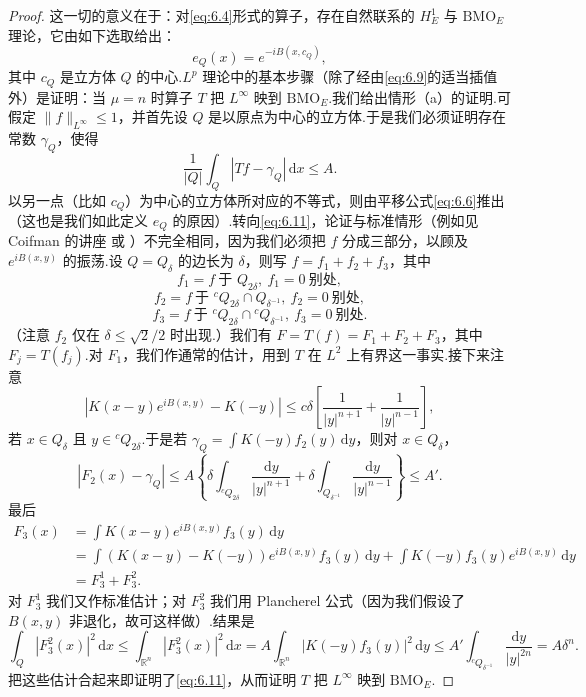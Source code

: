 \documentclass[
  BookTitleCN={傅里叶分析中的振动积分},
  BookTitleEN={Oscillatory Integrals in Fourier Analysis},
  OriginalAuthor={E.~M. Stein},
  OriginalEdition={Proc. Sympos. Pure Math. 35, Part~1},
  OriginalPublisher={American Mathematical Society},
  OriginalYear={1979},
  Translator={翻译及重排},
  ModelUsed={Codex CLI},
  Biblatex=false,
  TranslationDate={2026年8月27日}
]{mathtranslation}
\numberwithin{equation}{chapter}   %
\newcommand{\R}{\mathbb{R}}
\begin{document}
\begin{proof}
  这一切的意义在于：对\eqref{eq:6.4}形式的算子，存在自然联系的 $H_{E}^{1}$ 与 $\mathrm{BMO}_{E}$ 理论，它由如下选取给出：
  \begin{equation}
    e_{Q}(x)=e^{-iB(x,c_{Q})}, \label{eq:6.10}
  \end{equation}
  其中 $c_{Q}$ 是立方体 $Q$ 的中心.$L^{p}$ 理论中的基本步骤（除了经由\eqref{eq:6.9}的适当插值外）是证明：当 $\mu=n$ 时算子 $T$ 把 $L^{\infty}$ 映到 $\mathrm{BMO}_{E}$.我们给出情形（a）的证明.可假定 $\|f\|_{L^{\infty}}\leq1$，并首先设 $Q$ 是以原点为中心的立方体.于是我们必须证明存在常数 $\gamma_{Q}$，使得
  \begin{equation}
    \frac{1}{|Q|}\int_{Q}|Tf-\gamma_{Q}|\,\mathrm{d}x\leq A . \label{eq:6.11}
  \end{equation}
  以另一点（比如 $c_{Q}$）为中心的立方体所对应的不等式，则由平移公式\eqref{eq:6.6}推出（这也是我们如此定义 $e_{Q}$ 的原因）.转向\eqref{eq:6.11}，论证与标准情形（例如见 Coifman 的讲座 \cite{ref5} 或 \cite{ref9}）不完全相同，因为我们必须把 $f$ 分成三部分，以顾及 $e^{iB(x,y)}$ 的振荡.设 $Q=Q_{\delta}$ 的边长为 $\delta$，则写 $f=f_{1}+f_{2}+f_{3}$，其中
  \[
    f_{1}=f\ \text{于 }Q_{2\delta},\ f_{1}=0\ \text{别处},
  \]
  \[
    f_{2}=f\ \text{于 }{}^cQ_{2\delta}\cap Q_{\delta^{-1}},\ f_{2}=0\ \text{别处},
  \]
  \[
    f_{3}=f\ \text{于 }{}^cQ_{2\delta}\cap{}^cQ_{\delta^{-1}},\ f_{3}=0\ \text{别处} .
  \]
  （注意 $f_{2}$ 仅在 $\delta\leq\sqrt{2}/2$ 时出现.）我们有 $F=T(f)=F_{1}+F_{2}+F_{3}$，其中 $F_{j}=T(f_{j})$.对 $F_{1}$，我们作通常的估计，用到 $T$ 在 $L^{2}$ 上有界这一事实.接下来注意
  \[
    |K(x-y)e^{iB(x,y)}-K(-y)|\leq c\delta\left[\frac{1}{|y|^{n+1}}+\frac{1}{|y|^{n-1}}\right],
  \]
  若 $x\in Q_{\delta}$ 且 $y\in{}^cQ_{2\delta}$.于是若 $\gamma_{Q}=\int K(-y)f_{2}(y)\,\mathrm{d}y$，则对 $x\in Q_{\delta}$，
  \[
    |F_{2}(x)-\gamma_{Q}|\leq A\left\{\delta\int_{{}^{c}Q_{2\delta}}\frac{\mathrm{d}y}{|y|^{n+1}}+\delta\int_{Q_{\delta^{-1}}}\frac{\mathrm{d}y}{|y|^{n-1}}\right\}\leq A' .
  \]
  最后
  \begin{align*}
    F_{3}(x)&=\int K(x-y)e^{iB(x,y)}f_{3}(y)\,\mathrm{d}y\\
    &=\int(K(x-y)-K(-y))e^{iB(x,y)}f_{3}(y)\,\mathrm{d}y+\int K(-y)f_{3}(y)e^{iB(x,y)}\,\mathrm{d}y\\
    &=F_{3}^{1}+F_{3}^{2}.
  \end{align*}
  对 $F_{3}^{1}$ 我们又作标准估计；对 $F_{3}^{2}$ 我们用 Plancherel 公式（因为我们假设了 $B(x,y)$ 非退化，故可这样做）.结果是
  \[
    \int_{Q}|F_{3}^{2}(x)|^{2}\,\mathrm{d}x\leq\int_{\R^{n}}|F_{3}^{2}(x)|^{2}\,\mathrm{d}x=A\int_{\R^{n}}|K(-y)f_{3}(y)|^{2}\,\mathrm{d}y\leq A'\int_{{}^{c}Q_{\delta^{-1}}}\frac{\mathrm{d}y}{|y|^{2n}}=A\delta^{n}.
  \]
  把这些估计合起来即证明了\eqref{eq:6.11}，从而证明 $T$ 把 $L^{\infty}$ 映到 $\mathrm{BMO}_{E}$.
\end{proof}
\end{document}
